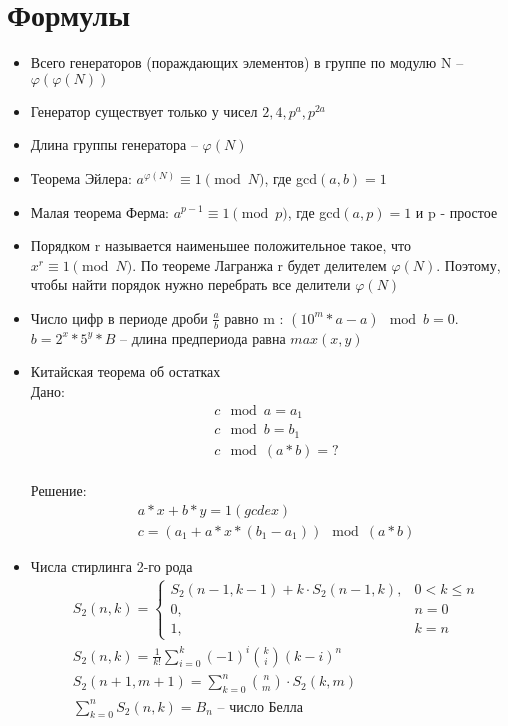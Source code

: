 \documentclass{article}
\begin{document}
\section{Формулы}
\begin{itemize}
\item Всего генераторов (пораждающих элементов) в группе по модулю N -- $\varphi(\varphi(N))$
\item Генератор существует только у чисел $2, 4, p^a, p^{2a}$
\item Длина группы генератора -- $\varphi(N)$
\item Теорема Эйлера: $a^{\varphi(N)} \equiv 1 \pmod{N}$, где gcd$(a, b) = 1$
\item Малая теорема Ферма: $a^{p-1} \equiv 1 \pmod{p}$, где gcd$(a, p) = 1$ и p - простое
\item Порядком r называется наименьшее положительное такое, что $x^r \equiv 1 \pmod{N}$.
По теореме Лагранжа r будет делителем $\varphi(N)$. Поэтому, чтобы найти порядок нужно перебрать все делители $\varphi(N)$
\item Число цифр в периоде дроби $\frac{a}{b}$ равно m : $(10^{m}*a - a) \mod{b} = 0$. $b = 2^x*5^y*B$ -- длина предпериода равна $max(x, y)$
\item Китайская теорема об остатках
\\ Дано: 
\begin{equation*}
  \begin{split}
    &c\mod a = a_1 \\
    &c\mod b = b_1 \\
    &c\mod (a * b) = ?
  \end{split}
  \end{equation*}
\\ Решение:
\begin{equation*}
  \begin{split}
    &a*x + b*y = 1 (gcdex)\\
    &c = (a_1 + a * x * (b_1 - a_1)) \mod (a * b)
  \end{split}
  \end{equation*}
\item Числа стирлинга 2-го рода
\begin{equation}
  \begin{split}
    &S_2(n, k) = 
    \left\{
    \begin{array}{cc}
    S_2(n-1, k-1) + k \cdot S_2(n-1, k), & 0 < k \le n\\
    0, & n = 0\\
    1, & k = n
    \end{array}
    \right.\\
    &S_2(n, k) = \frac{1}{k!}\sum\limits_{i=0}^k(-1)^{i}\binom{k}{i}(k - i)^n\\
    &S_2(n + 1, m + 1) = \sum\limits_{k=0}^n\binom{n}{m} \cdot S_2(k, m)\\
    &\sum\limits_{k=0}^nS_2(n, k) = B_n \text{ -- число Белла}
  \end{split}
\end{equation}
\begin{longtable}[c]{lllllllllll}


\end{longtable}
\end{itemize}
\end{document}
